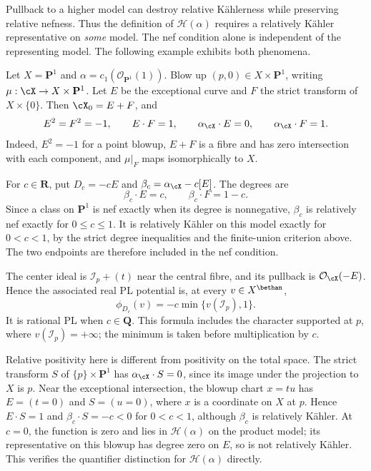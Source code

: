 Pullback to a higher model can destroy relative K\"ahlerness
while preserving relative nefness. Thus the definition of
$\mathcal H(\alpha)$ requires a relatively K\"ahler representative
on \emph{some} model. The nef condition alone is independent
of the representing model. The following example exhibits
both phenomena.

\begin{example}\label{ex:mp-model-positivity-interval}
Let $X=\mathbf P^1$ and $\alpha=c_1(\mathcal O_{\mathbf P^1}(1))$.
Blow up $(p,0)\in X\times\mathbf P^1$, writing
$\mu:\cX\to X\times\mathbf P^1$. Let $E$ be the exceptional
curve and $F$ the strict transform of $X\times\{0\}$. Then
$\cX_0=E+F$, and
\[
 E^2=F^2=-1,\qquad E\cdot F=1,\qquad
 \alpha_{\cX}\cdot E=0,\qquad \alpha_{\cX}\cdot F=1.
\]
Indeed, $E^2=-1$ for a point blowup, $E+F$ is a fibre and
has zero intersection with each component, and $\mu|_F$
maps isomorphically to $X$.

For $c\in\mathbf R$, put $D_c=-cE$ and
$\beta_c=\alpha_{\cX}-c[E]$. The degrees are
\[
                         \beta_c\cdot E=c,
                         \qquad \beta_c\cdot F=1-c.
\]
Since a class on $\mathbf P^1$ is nef exactly when its degree
is nonnegative, $\beta_c$ is relatively nef exactly for
$0\leq c\leq1$. It is relatively K\"ahler on this model
exactly for $0<c<1$, by the strict degree inequalities and
the finite-union criterion above. The two endpoints are
therefore included in the nef condition.

The center ideal is $\mathcal I_p+(t)$ near the central fibre,
and its pullback is $\mathcal O_{\cX}(-E)$. Hence the associated
real PL potential is, at every $v\in X^{\bethan}$,
\[
             \phi_{D_c}(v)=-c\min\{v(\mathcal I_p),1\}.
\]
It is rational PL when $c\in\mathbf Q$. This formula includes
the character supported at $p$, where $v(\mathcal I_p)=+\infty$;
the minimum is taken before multiplication by $c$.

Relative positivity here is different from positivity on the
total space. The strict transform $S$ of $\{p\}\times\mathbf P^1$
has $\alpha_{\cX}\cdot S=0$, since its image under the
projection to $X$ is $p$. Near the exceptional intersection,
the blowup chart $x=tu$ has $E=(t=0)$ and $S=(u=0)$, where
$x$ is a coordinate on $X$ at $p$. Hence $E\cdot S=1$ and
$\beta_c\cdot S=-c<0$ for $0<c<1$, although $\beta_c$ is
relatively K\"ahler. At $c=0$, the function is zero and lies
in $\mathcal H(\alpha)$ on the product model; its representative
on this blowup has degree zero on $E$, so is not relatively
K\"ahler. This verifies the quantifier distinction for
$\mathcal H(\alpha)$ directly.
\end{example}

